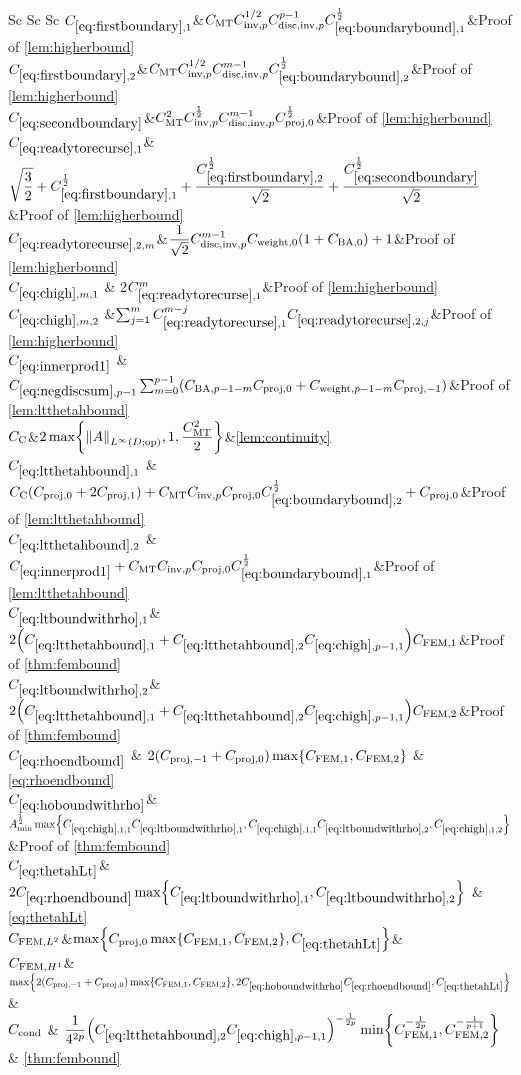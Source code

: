 \begin{longtabu}{Sc Sc Sc}
  $\CBo$&$\CMT \CinvVhp^{1/2} \Chinv^{p-1} \Cboundaryo^{\half} $&Proof of \cref{lem:higherbound}\\
  $\CBt$&$\CMT \CinvVhp^{1/2} \Chinv^{m-1} \Cboundaryt^{\half}$&Proof of \cref{lem:higherbound}\\
  $\CBth$&$C_{\mathrm{MT}}^2 C_{\mathrm{inv},p}^{\frac{1}{2}} C_{\mathrm{disc},\mathrm{inv},p}^{m-1}C_{\mathrm{proj},0}^{\frac{1}{2}}$&Proof of \cref{lem:higherbound}\\
  $\CReco$&$\displaystyle\sqrt{\frac32} + \CBo^{\half} + \frac{\CBt^{\half}}{\sqrt{2}}+ \frac{\CBth^{\half}}{\sqrt{2}}$&Proof of \cref{lem:higherbound}\\
  $\CRectfn{m}$&$\displaystyle\frac1{\sqrt{2}}\Chinv^{m-1}\Cwfn{0}\mleft(1+\CSZfn{0}\mright)+1$&Proof of \cref{lem:higherbound}\\
  $\Chighmo$ & 2$\CReco^m$&Proof of \cref{lem:higherbound}\\
  $\Chighmt$ &$\sum_{j=1}^{m}\CReco^{m-j} \CRectfn{j}$&Proof of \cref{lem:higherbound}\\
  $\Cfourteen$ &$\Csumfn{p-1}\sum_{m=0}^{p-1} \mleft(\CSZfn{p-1-m}\Cmmofn{0} + \Cwfn{p-1-m} \Cmmofn{-1}\mright)$&Proof of \cref{lem:ltthetahbound}\\
    $C_{\mathrm{C}}$&$\displaystyle2\max\set{\NLiDop{A},1,\frac{\CMT^2}2}$&\cref{lem:continuity}\\
  $\Cfirst$ &$\Cc\mleft(\Cmmofn{0} + 2\Cmmofn{1}\mright) + \CMT \CinvVhp \Cmmofn{0} \Cboundaryt^{\half} + \Cmmofn{0}$&Proof of \cref{lem:ltthetahbound}\\
    $\Csecond$ &$\Cfourteen  + \CMT \CinvVhp \Cmmofn{0}\Cboundaryo^{\half}$&Proof of \cref{lem:ltthetahbound}\\
  $\CLtboundo$&$ 2\mleft(\Cfirst + \Csecond\Chighfn{p-1,1}\mright)\CFEMo$&Proof of \cref{thm:fembound}\\
  $\CLtboundt$&$2\mleft(\Cfirst + \Csecond\Chighfn{p-1,1}\mright)\CFEMt$&Proof of \cref{thm:fembound}\\
  $\Crhoendbound$ & $2\mleft(\Cmmofn{-1} + \Cmmofn{0}\mright)\max\set{\CFEMo,\CFEMt}$ & \cref{eq:rhoendbound}\\
  $\CHobound$&$\Amin^{\half}\max\set{\Chighfn{1,1}\CLtboundo,\Chighfn{1,1}\CLtboundt,\Chighfn{1,2}}$&Proof of \cref{thm:fembound}\\
      $\CthetahLt$& $2\Crhoendbound \max\set{\CLtboundo,\CLtboundt} $ & \cref{eq:thetahLt}\\
  $C_{\mathrm{FEM},L^{2}}$&$\max\set{\Cmmofn{0}\max\set{\CFEMo,\CFEMt},\CthetahLt}$&\\
$C_{\mathrm{FEM},H^{1}}$&$\max\set{2\mleft(\Cmmofn{-1}+\Cmmofn{0}\mright)\max\set{\CFEMo,\CFEMt},2\CHobound\Crhoendbound,\CthetahLt} $&\\
    $C_{\mathrm{cond}}$ & $\displaystyle\frac1{4^{2p}} \mleft(\Csecond\Chighfn{p-1,1}\mright)^{-\frac1{2p}} \min\set{\CFEMo^{-\frac1{2p}},\CFEMt^{-\frac1{p+1}}}$ & \cref{thm:fembound}\\
\bottomrule
\end{longtabu}
